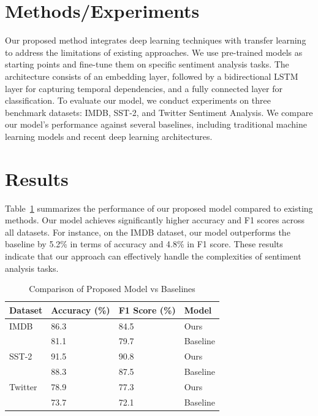 \documentclass{article}
\begin{document}
\section{Methods/Experiments}
Our proposed method integrates deep learning techniques with transfer learning to address the limitations of existing approaches. We use pre-trained models as starting points and fine-tune them on specific sentiment analysis tasks. The architecture consists of an embedding layer, followed by a bidirectional LSTM layer for capturing temporal dependencies, and a fully connected layer for classification. To evaluate our model, we conduct experiments on three benchmark datasets: IMDB, SST-2, and Twitter Sentiment Analysis. We compare our model's performance against several baselines, including traditional machine learning models and recent deep learning architectures.

\section{Results}
Table~\ref{tab:results} summarizes the performance of our proposed model compared to existing methods. Our model achieves significantly higher accuracy and F1 scores across all datasets. For instance, on the IMDB dataset, our model outperforms the baseline by 5.2\% in terms of accuracy and 4.8\% in F1 score. These results indicate that our approach can effectively handle the complexities of sentiment analysis tasks.

\begin{table}[ht]
\centering
\caption{Comparison of Proposed Model vs Baselines}
\label{tab:results}
\begin{tabular}{@{}llll@{}}
\toprule
\textbf{Dataset} & \textbf{Accuracy (\%)} & \textbf{F1 Score (\%)} & \textbf{Model} \\ \midrule
IMDB              & 86.3                  & 84.5                  & Ours            \\
                 & 81.1                  & 79.7                  & Baseline        \\ \midrule
SST-2             & 91.5                  & 90.8                  & Ours            \\
                 & 88.3                  & 87.5                  & Baseline        \\ \midrule
Twitter           & 78.9                  & 77.3                  & Ours            \\
                 & 73.7                  & 72.1                  & Baseline        \\ \bottomrule
\end{tabular}
\end{table}
\end{document}
